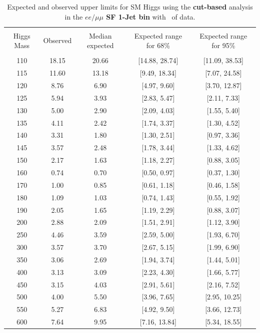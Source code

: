\begin{table}[hbp!]
\begin{center}
\begin{tabular}{c c c c c}
\hline
\vspace{-3mm} && \\
 Higgs Mass & Observed  & Median expected & Expected range for 68\% & Expected range for 95\%   \\
\vspace{-3mm} && \\
\hline
110 & 18.15 & 20.66 & [14.88, 28.74] & [11.09, 38.53] \\
115 & 11.60 & 13.18 & [9.49, 18.34] & [7.07, 24.58] \\
120 & 8.76 & 6.90 & [4.97, 9.60] & [3.70, 12.87] \\
125 & 5.94 & 3.93 & [2.83, 5.47] & [2.11, 7.33] \\
130 & 5.00 & 2.90 & [2.09, 4.03] & [1.55, 5.40] \\
135 & 4.11 & 2.42 & [1.74, 3.37] & [1.30, 4.52] \\
140 & 3.31 & 1.80 & [1.30, 2.51] & [0.97, 3.36] \\
145 & 3.57 & 2.48 & [1.78, 3.44] & [1.33, 4.62] \\
150 & 2.17 & 1.63 & [1.18, 2.27] & [0.88, 3.05] \\
160 & 0.74 & 0.70 & [0.50, 0.97] & [0.37, 1.30] \\
170 & 1.00 & 0.85 & [0.61, 1.18] & [0.46, 1.58] \\
180 & 1.09 & 1.03 & [0.74, 1.43] & [0.55, 1.92] \\
190 & 2.05 & 1.65 & [1.19, 2.29] & [0.88, 3.07] \\
200 & 2.88 & 2.09 & [1.51, 2.91] & [1.12, 3.90] \\
250 & 4.46 & 3.59 & [2.59, 5.00] & [1.93, 6.70] \\
300 & 3.57 & 3.70 & [2.67, 5.15] & [1.99, 6.90] \\
350 & 3.06 & 2.69 & [1.94, 3.74] & [1.44, 5.01] \\
400 & 3.13 & 3.09 & [2.23, 4.30] & [1.66, 5.77] \\
450 & 3.15 & 4.03 & [2.91, 5.61] & [2.16, 7.52] \\
500 & 4.00 & 5.50 & [3.96, 7.65] & [2.95, 10.25] \\
550 & 5.27 & 6.83 & [4.92, 9.50] & [3.66, 12.73] \\
600 & 7.64 & 9.95 & [7.16, 13.84] & [5.34, 18.55] \\
\hline
\end{tabular}
\caption{Expected and observed upper limits for SM Higgs using the
  {\bf cut-based} analysis in the {\bf $ee/\mu\mu$ SF 1-Jet bin} with \intlumiEightTeV\ of data.}
\label{tab:cutbase_uls_1jsf}
\end{center}
\end{table}


